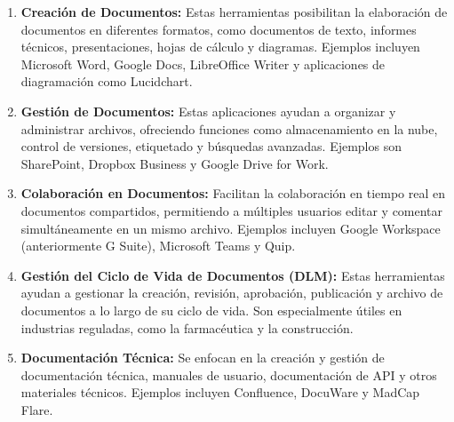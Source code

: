 \documentclass[letterpaper]{article}
\begin{document}
\begin{enumerate}[series=listWWNumxiv,label=\arabic*.,ref=\arabic*]
\item \textbf{Creación de Documentos:} Estas herramientas posibilitan la elaboración de documentos en diferentes
formatos, como documentos de texto, informes técnicos, presentaciones, hojas de cálculo y diagramas. Ejemplos incluyen
Microsoft Word, Google Docs, LibreOffice Writer y aplicaciones de diagramación como Lucidchart.
\item \textbf{Gestión de Documentos:} Estas aplicaciones ayudan a organizar y administrar archivos, ofreciendo funciones
como almacenamiento en la nube, control de versiones, etiquetado y búsquedas avanzadas.
\foreignlanguage{english}{Ejemplos son SharePoint, Dropbox Business y Google Drive for Work.}
\item \textbf{Colaboración en Documentos:} Facilitan la colaboración en tiempo real en documentos compartidos,
permitiendo a múltiples usuarios editar y comentar simultáneamente en un mismo archivo. Ejemplos incluyen Google
Workspace (anteriormente G Suite), Microsoft Teams y Quip.
\item \textbf{Gestión del Ciclo de Vida de Documentos (DLM):} Estas herramientas ayudan a gestionar la creación,
revisión, aprobación, publicación y archivo de documentos a lo largo de su ciclo de vida. Son especialmente útiles en
industrias reguladas, como la farmacéutica y la construcción.
\item \textbf{Documentación Técnica:} Se enfocan en la creación y gestión de documentación técnica, manuales de usuario,
documentación de API y otros materiales técnicos. Ejemplos incluyen Confluence, DocuWare y MadCap Flare.
\end{enumerate}

\bigskip
\end{document}
